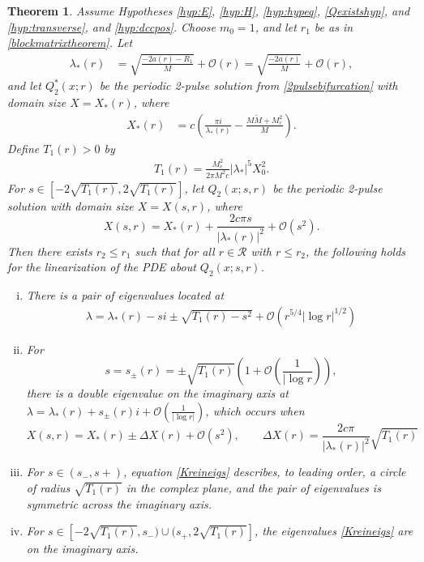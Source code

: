 \documentclass[12pt]{elsarticle}
\theoremstyle{plain}
\newtheorem{theorem}{Theorem}
\theoremstyle{definition}
\theoremstyle{remark}
\numberwithin{theorem}{section}
\numberwithin{equation}{section}
\begin{document}
\begin{theorem}\label{th:Kreinbubble}
Assume Hypotheses \ref{hyp:E}, \ref{hyp:H}, \ref{hyp:hypeq}, \ref{Qexistshyp}, and \ref{hyp:transverse}, and \ref{hyp:dccpos}. Choose $m_0 = 1$, and let $r_1$ be as in \cref{blockmatrixtheorem}. Let 
\begin{align}\label{deflambdastar}
\lambda_*(r) &= \sqrt{ \frac{-2a(r) - R_1 }{M} } + \mathcal{O}(r) = \sqrt{ \frac{-2a(r)}{M} } + \mathcal{O}(r),
\end{align}
and let $Q_2^*(x; r)$ be the periodic 2-pulse solution from \cref{2pulsebifurcation} with domain size $X = X_*(r)$, where
\begin{align}\label{defXstar}
X_*(r) &= c \left( \frac{\pi i}{\lambda_*(r)} - \frac{M \tilde{M} + M_c^2 }{M}\right).
\end{align}
Define $T_1(r) > 0$ by 
\begin{align}\label{defT0}
T_1(r) = \frac{M_c^2 }{2 \pi M^2 c } |\lambda_*|^5 X_0^2.
\end{align}
For $s \in [-2\sqrt{T_1(r)}, 2 \sqrt{T_1(r)}]$, let $Q_2(x; s, r)$ be the periodic 2-pulse solution with domain size $X = X(s, r)$, where
\begin{equation}
X(s,r) = X_*(r) + \frac{2 c \pi s}{|\lambda_*(r)|^2} + \mathcal{O}(s^2).
\end{equation}
Then there exists $r_2 \leq r_1$ such that for all $r \in \mathcal{R}$ with $r \leq r_2$, the following holds for the linearization of the PDE about $Q_2(x; s, r)$.
\begin{enumerate}[(i)]
	\item There is a pair of eigenvalues located at
	\begin{align}\label{Kreineigs}
	\lambda = \lambda_*(r) - s i \pm \sqrt{ T_1(r) -  s^2} + \mathcal{O}\left(r^{5/4}|\log r|^{1/2} \right)
	\end{align}

	\item For
	\[
	s = s_\pm(r) = \pm \sqrt{T_1(r)}\left( 1 +  \mathcal{O}\left(\frac{1}{|\log r} \right) \right),
	\]
	there is a double eigenvalue on the imaginary axis at $\lambda = \lambda_*(r) + s_\pm(r) i + \mathcal{O}\left(\frac{1}{|\log r|} \right)$, which occurs when 
	\begin{equation}\label{KreinDeltaX}
	X(s, r) = X_*(r) \pm \Delta X(r) + \mathcal{O}(s^2), \qquad \Delta X(r) = \frac{2 c \pi}{|\lambda_*(r)|^2}\sqrt{T_1(r)} 
	\end{equation}
\item For $s \in (s_-, s+)$, equation \cref{Kreineigs} describes, to leading order, a circle of radius $\sqrt{T_1(r)}$ in the complex plane, and the pair of eigenvalues is symmetric across the imaginary axis.
\item For $s \in [-2\sqrt{T_1(r)}, s_-) \cup (s_+, 2 \sqrt{T_1(r)}]$, the eigenvalues \cref{Kreineigs} are on the imaginary axis.
\end{enumerate}
\end{theorem}
\end{document}
